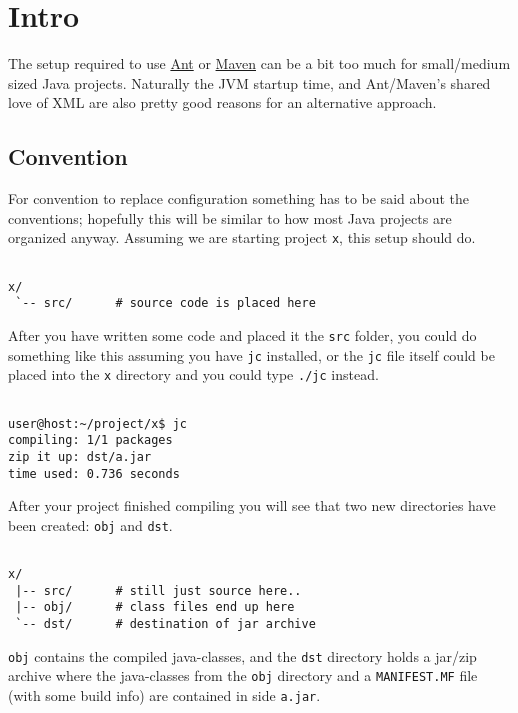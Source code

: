 
\section{ Intro }

The setup required to use  \href{http://ant.apache.org}{Ant} or
 \href{http://maven.apache.org}{Maven} can be a bit too much for
small/medium sized Java projects. Naturally the JVM startup time,
and Ant/Maven's shared love of XML are also pretty good reasons
for an alternative approach.




\subsection{ Convention }

For convention to replace configuration something has to be said about
the conventions; hopefully this will be similar to how most Java projects
are organized anyway. Assuming we are starting project \texttt{x}, this setup
should do.


{\small
\begin{verbatim}

x/
 `-- src/      # source code is placed here

\end{verbatim}
}


After you have written some code and placed it the \texttt{src} folder, you
could do something like this assuming you have \texttt{jc} installed, or the
\texttt{jc} file itself could be placed into the \texttt{x} directory and you could
type \texttt{./jc} instead.


{\small
\begin{verbatim}

user@host:~/project/x$ jc
compiling: 1/1 packages
zip it up: dst/a.jar
time used: 0.736 seconds

\end{verbatim}
}


After your project finished compiling you will see that two new directories
have been created: \texttt{obj} and \texttt{dst}.


{\small
\begin{verbatim}

x/
 |-- src/      # still just source here..
 |-- obj/      # class files end up here
 `-- dst/      # destination of jar archive

\end{verbatim}
}


\texttt{obj} contains the compiled java-classes, and the \texttt{dst} directory holds a
jar/zip archive where the java-classes from the \texttt{obj} directory and a
\texttt{MANIFEST.MF} file (with some build info) are contained in side \texttt{a.jar}.



